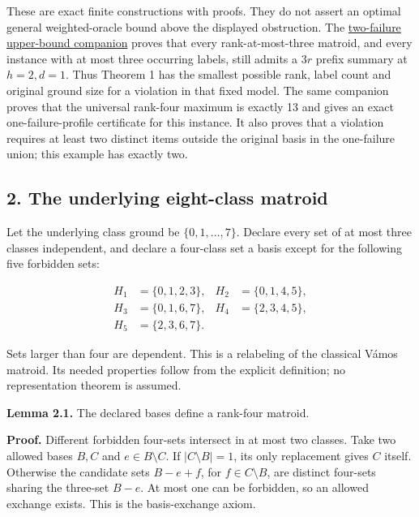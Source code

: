 These are exact finite constructions with proofs. They do not assert an optimal general weighted-oracle bound above the displayed obstruction. The \href{https://github.com/icekylinx/algorithm-frontier/blob/main/problems/matroid-failure-summaries/manuscripts/two-failure-oracle-prefix-bounds.md}{two-failure upper-bound companion} proves that every rank-at-most-three matroid, and every instance with at most three occurring labels, still admits a \(3r\) prefix summary at \(h=2,d=1\). Thus Theorem 1 has the smallest possible rank, label count and original ground size for a violation in that fixed model. The same companion proves that the universal rank-four maximum is exactly 13 and gives an exact one-failure-profile certificate for this instance. It also proves that a violation requires at least two distinct items outside the original basis in the one-failure union; this example has exactly two.

\hypertarget{af-f44144c751-the-underlying-eight-class-matroid}{%
\subsection{2. The underlying eight-class matroid}\label{af-f44144c751-the-underlying-eight-class-matroid}}

Let the underlying class ground be \(\{0,1,\ldots,7\}\). Declare every set of at most three classes independent, and declare a four-class set a basis except for the following five forbidden sets:

\[
\begin{aligned}
H_1&=\{0,1,2,3\}, & H_2&=\{0,1,4,5\},\\
H_3&=\{0,1,6,7\}, & H_4&=\{2,3,4,5\},\\
H_5&=\{2,3,6,7\}.&&
\end{aligned}
\tag{WO2}
\]

Sets larger than four are dependent. This is a relabeling of the classical Vámos matroid. Its needed properties follow from the explicit definition; no representation theorem is assumed.

\textbf{Lemma 2.1.} The declared bases define a rank-four matroid.

\textbf{Proof.} Different forbidden four-sets intersect in at most two classes. Take two allowed bases \(B,C\) and \(e\in B\setminus C\). If \(|C\setminus B|=1\), its only replacement gives \(C\) itself. Otherwise the candidate sets \(B-e+f\), for \(f\in C\setminus B\), are distinct four-sets sharing the three-set \(B-e\). At most one can be forbidden, so an allowed exchange exists. This is the basis-exchange axiom.

